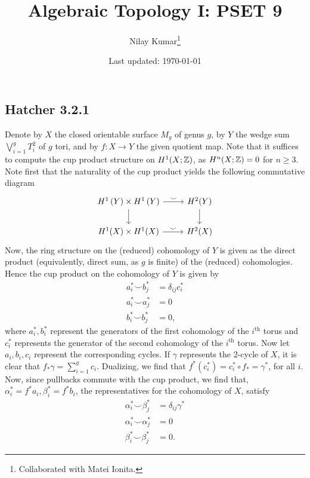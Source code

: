 \documentclass{../mathnotes}
\title{Algebraic Topology I: PSET 9}
\author{Nilay Kumar\footnote{Collaborated with Matei Ionita.}}
\date{Last updated: \today}
\begin{document}
\maketitle

\subsection*{Hatcher 3.2.1}

Denote by $X$ the closed orientable surface $M_g$ of genus $g$, by $Y$
the wedge sum $\bigvee_{i=1}^g T^2_i$ of $g$ tori, and by $f:X\to Y$ the given
quotient map. Note that it suffices to compute the cup product structure on
$H^1(X;\mathbb{Z})$, as $H^n(X;\mathbb{Z})=0$ for $n\geqslant 3$.
Note first that the naturality of the cup product yields the following
commutative diagram
\begin{equation*}
    \begin{tikzcd}
        H^1\left( Y\right)\times H^1\left(Y\right)\ar{r}{\smile}\ar{d} & H^2(Y)\ar{d}\\
        H^1(X)\times H^1(X)\ar{r}{\smile} & H^2(X)
    \end{tikzcd}
\end{equation*}
Now, the ring structure on the (reduced) cohomology of $Y$ is given as the direct product
(equivalently, direct sum, as $g$ is finite) of the (reduced) cohomologies.
Hence the cup product on the cohomology of $Y$ is given by
\begin{align*}
    a_i^*\smile b_j^* &= \delta_{ij}c_i^*\\
    a_i^*\smile a_j^* &= 0\\
    b_i^*\smile b_j^* &= 0,
\end{align*}
where $a_i^*,b_i^*$ represent the generators of the first cohomology of the $i^\text{th}$
torus and $c_i^*$ represents the generator of the second cohomology of the $i^\text{th}$
torus. Now let $a_i,b_i,c_i$ represent the corresponding cycles. If $\gamma$ represents
the 2-cycle of $X$, it is clear that $f_*\gamma=\sum_{i=1}^gc_i$. Dualizing, we find that
$f^*(c_i^*)=c_i^*\circ f_*=\gamma^*$, for all $i$. Now, since pullbacks commute
with the cup product, we find that, $\alpha_i^*=f^*a_i,\beta_i^*=f^*b_i$, the representatives
for the cohomology of $X$, satisfy 
\begin{align*}
    \alpha_i^*\smile \beta_j^* &= \delta_{ij}\gamma^*\\
    \alpha_i^*\smile \alpha_j^* &= 0\\
    \beta_i^*\smile \beta_j^* &= 0.
\end{align*}
\end{document}
